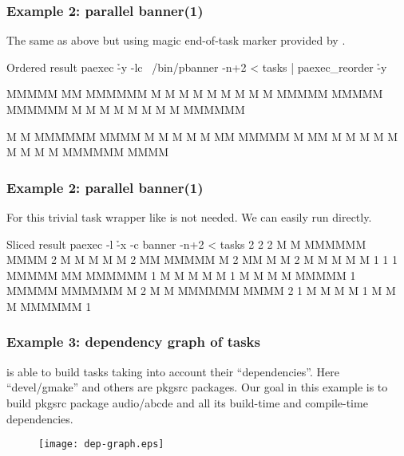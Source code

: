 \documentclass[hyperref={colorlinks=true}]{beamer}
\begin{document}
\linespread{0.5}
\begin{frame}[fragile]
  \frametitle{Example 2: parallel banner(1)}
The same as above but using magic end-of-task marker provided by .
  \begin{block}{}
      \begin{CodeSmall}{Ordered result}
\prompt{\$} paexec \h{-y} -lc ~/bin/pbanner -n+2 < tasks | paexec_reorder \h{-y}


MMMMM     MM    MMMMMM
M    M   M  M   M
M    M  M    M  MMMMM
MMMMM   MMMMMM  M
M       M    M  M
M       M    M  MMMMMM



M    M  MMMMMM   MMMM
 M  M   M       M    M
  MM    MMMMM   M
  MM    M       M
 M  M   M       M    M
M    M  MMMMMM   MMMM


\prompt{\$}
      \end{CodeSmall}
  \end{block}
\end{frame}
\linespread{1}

\linespread{0.5}
\begin{frame}[fragile]
  \frametitle{Example 2: parallel banner(1)}
For this trivial task wrapper like  is not needed.
We can easily run  directly.
  \begin{block}{}
      \begin{CodeSmall}{Sliced result}
\prompt{\$} paexec -l \h{-x} -c banner -n+2 < tasks
2 
2 
2  M    M  MMMMMM   MMMM
2   M  M   M       M    M
2    MM    MMMMM   M
2    MM    M       M
2   M  M   M       M    M
1 
1 
1  MMMMM     MM    MMMMMM
1  M    M   M  M   M
1  M    M  M    M  MMMMM
1  MMMMM   MMMMMM  M
2  M    M  MMMMMM   MMMM
2 
1  M       M    M  M
1  M       M    M  MMMMMM
1 
\prompt{\$}
      \end{CodeSmall}
  \end{block}
\end{frame}
\linespread{1}

\begin{frame}[fragile]
  \frametitle{Example 3: dependency graph of tasks}
 is able to build tasks taking into account their ``dependencies''.
Here ``devel/gmake'' and others are pkgsrc packages. Our goal in this example
is to build pkgsrc package audio/abcde and all its build-time and compile-time
dependencies.
  \begin{block}{}
    \begin{figure}
      \texttt{[image: dep-graph.eps]}
    \end{figure}
  \end{block}
\end{frame}
\end{document}
